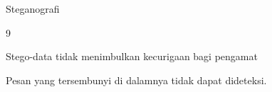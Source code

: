 \documentclass{article}
\begin{document}

Steganografi

9

Stego-data tidak menimbulkan kecurigaan bagi pengamat

Pesan yang tersembunyi di dalamnya tidak dapat dideteksi.
\end{document}
